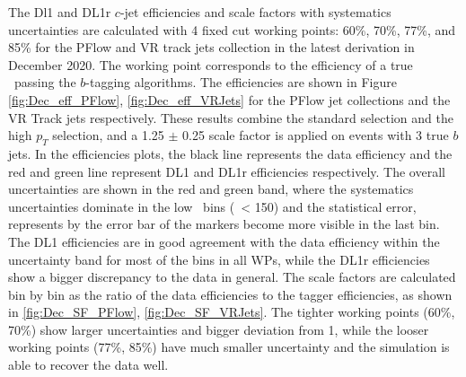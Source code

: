 \documentclass[letterpaper,12pt]{article}
\begin{document}
The Dl1 and DL1r $c$-jet efficiencies and scale factors with systematics 
uncertainties are calculated with 4 fixed cut working points: 
60\%, 70\%, 77\%, and 85\% for the PFlow and VR track jets collection in the latest derivation 
in December 2020. The working point corresponds to the efficiency of a true \bjet\ passing 
the $b$-tagging algorithms. 
The efficiencies are shown in Figure \ref{fig:Dec_eff_PFlow}, \ref{fig:Dec_eff_VRJets} 
for the PFlow jet collections and the VR Track jets respectively. 
These results combine the standard selection and the high $p_T$ selection, 
and a 1.25 $\pm$ 0.25 scale factor is applied on events with 3 true $b$ jets. 
In the efficiencies plots, the black line represents the data efficiency and the red and 
green line represent DL1 and DL1r efficiencies respectively. The overall uncertainties are shown 
in the red and green band, where the systematics uncertainties dominate 
in the low \pt\ bins (\pt\ < 150) and the statistical error, represents by the error bar of the 
markers become more visible in the last bin. The DL1 efficiencies are in good agreement with the 
data efficiency within the uncertainty band for most of the bins in all WPs, while the DL1r efficiencies 
show a bigger discrepancy to the data in general. 
The scale factors are calculated bin by bin as the ratio of the data efficiencies to the tagger efficiencies,
as shown in \ref{fig:Dec_SF_PFlow}, \ref{fig:Dec_SF_VRJets}. 
The tighter working points (60\%, 70\%) show larger uncertainties and bigger deviation from 1, while
the looser working points (77\%, 85\%) have much smaller uncertainty and the simulation is able to 
recover the data well. 
\end{document}
